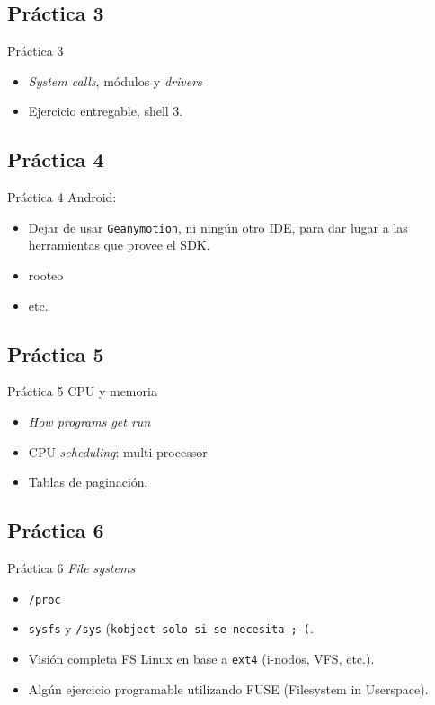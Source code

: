 \subsection{Práctica 3}
\begin{frame}{Práctica 3}
\begin{itemize}
\item \textit{System calls}, módulos y \textit{drivers}
\item Ejercicio entregable, shell 3.
\end{itemize}
\end{frame}

\subsection{Práctica 4}
\begin{frame}{Práctica 4}
  Android:
  \begin{itemize}
  \item Dejar de usar \texttt{Geanymotion}, ni ningún otro IDE,
    para dar lugar a las herramientas que provee el SDK.
  \item rooteo
  \item etc.
  \end{itemize}
\end{frame}  
\subsection{Práctica 5}
\begin{frame}{Práctica 5}
  CPU y memoria
  \begin{itemize}
  \item \textit{How programs get run}
  \item CPU \textit{scheduling}: multi-processor
  \item Tablas de paginación.
  \end{itemize}
\end{frame}  

\subsection{Práctica 6}
\begin{frame}{Práctica 6}
  \textit{File systems}
  \begin{itemize}
  \item \texttt{/proc}
  \item \texttt{sysfs} y \texttt{/sys} (\texttt{kobject solo si se
      necesita ;-(}.
  \item Visión completa FS Linux en base a \texttt{ext4} (i-nodos, VFS,
    etc.).
    
  \item Algún ejercicio programable utilizando FUSE (Filesystem in Userspace).
  \end{itemize}
\end{frame}  

